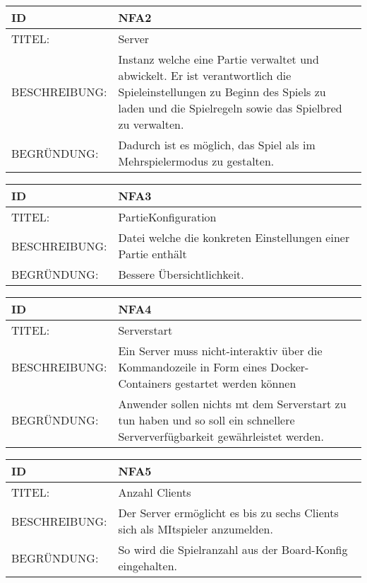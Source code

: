 \documentclass{uulm-assignment}
\begin{document}
    \begin{tabularx}{\textwidth}{|l|X |} \hline
        \textbf{ID} & \textbf{NFA2} \\
        \hline
        TITEL: &  Server\\
        \hline
        BESCHREIBUNG: & Instanz welche eine Partie verwaltet und abwickelt.  Er ist verantwortlich die Spieleinstellungen zu Beginn des Spiels zu laden und die Spielregeln sowie das Spielbred zu verwalten.\\
        \hline
        BEGRÜNDUNG: &  Dadurch ist es möglich, das Spiel als im Mehrspielermodus zu gestalten.\\
        \hline
    \end{tabularx}

    \begin{tabularx}{\textwidth}{|l|X |} \hline
        \textbf{ID} & \textbf{NFA3} \\
        \hline
        TITEL: &  PartieKonfiguration\\
        \hline
        BESCHREIBUNG: &  Datei welche die konkreten Einstellungen einer Partie enthält\\
        \hline
        BEGRÜNDUNG: &  Bessere Übersichtlichkeit.\\
        \hline
    \end{tabularx}

    \begin{tabularx}{\textwidth}{|l|X |} \hline
        \textbf{ID} & \textbf{NFA4} \\
        \hline
        TITEL: &  Serverstart\\
        \hline
        BESCHREIBUNG: &  Ein Server muss nicht-interaktiv über die Kommandozeile in Form eines Docker-
Containers gestartet werden können \\
        \hline
        BEGRÜNDUNG: &  Anwender sollen nichts mt dem Serverstart zu tun haben und so soll ein schnellere Serververfügbarkeit gewährleistet werden.\\
        \hline
    \end{tabularx}

    \begin{tabularx}{\textwidth}{|l|X |} \hline
        \textbf{ID} & \textbf{NFA5} \\
        \hline
        TITEL: & Anzahl Clients \\
        \hline
        BESCHREIBUNG: &  Der Server ermöglicht es bis zu sechs Clients sich als MItspieler anzumelden.\\
        \hline
        BEGRÜNDUNG: &  So wird die Spielranzahl aus der Board-Konfig eingehalten.\\
        \hline
    \end{tabularx}
\end{document}
